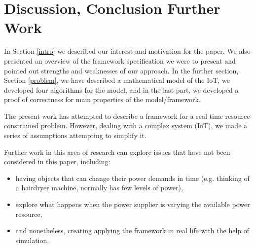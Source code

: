 \documentclass[../main/Self-Stabilization.tex]{subfiles}
\begin{document}
\section{Discussion, Conclusion Further Work}
In Section \ref{intro} we described our interest and motivation for the paper. We also presented an overview of the framework specification we were to present and pointed out strengths and weaknesses of our approach. In the further section, Section \ref{problem}, we have described a mathematical model of the IoT, we developed four algorithms for the model, and in the last part, we developed a proof of correctness for main properties of the model/framework.

The present work has attempted to describe a framework for a real time resource-constrained problem. However, dealing with a complex system (IoT), we made a series of assumptions attempting to simplify it.

Further work in this area of research can explore issues that have not been considered in this paper, including: 
\begin{itemize}
    \item having objects that can change their power demands in time (e.g. thinking of a hairdryer machine, normally has few levels of power),
    \item explore what happens when the power supplier is varying the available power resource,
    \item and nonetheless, creating applying the framework in real life with the help of simulation.
\end{itemize}
\end{document}
